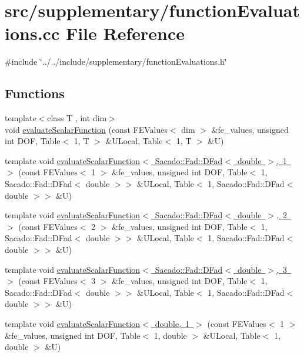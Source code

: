 \section{src/supplementary/function\+Evaluations.cc File Reference}
\label{function_evaluations_8cc}
{\ttfamily \#include \char`\"{}../../include/supplementary/function\+Evaluations.\+h\char`\"{}}\newline
\subsection*{Functions}
\begin{DoxyCompactItemize}
\item 
{\footnotesize template$<$class T , int dim$>$ }\\void \mbox{\hyperlink{group___evaluation_functions_ga399ae2353249293211c021848a64175c}{evaluate\+Scalar\+Function}} (const F\+E\+Values$<$ dim $>$ \&fe\+\_\+values, unsigned int D\+OF, Table$<$ 1, T $>$ \&U\+Local, Table$<$ 1, T $>$ \&U)
\item 
template void \mbox{\hyperlink{function_evaluations_8cc_a6856c1b1b83231bc778cecda3950533d}{evaluate\+Scalar\+Function$<$ Sacado\+::\+Fad\+::\+D\+Fad$<$ double $>$, 1 $>$}} (const F\+E\+Values$<$ 1 $>$ \&fe\+\_\+values, unsigned int D\+OF, Table$<$ 1, Sacado\+::\+Fad\+::\+D\+Fad$<$ double $>$$>$ \&U\+Local, Table$<$ 1, Sacado\+::\+Fad\+::\+D\+Fad$<$ double $>$$>$ \&U)
\item 
template void \mbox{\hyperlink{function_evaluations_8cc_af8ed01aa7f3c36625c149e3600d96714}{evaluate\+Scalar\+Function$<$ Sacado\+::\+Fad\+::\+D\+Fad$<$ double $>$, 2 $>$}} (const F\+E\+Values$<$ 2 $>$ \&fe\+\_\+values, unsigned int D\+OF, Table$<$ 1, Sacado\+::\+Fad\+::\+D\+Fad$<$ double $>$$>$ \&U\+Local, Table$<$ 1, Sacado\+::\+Fad\+::\+D\+Fad$<$ double $>$$>$ \&U)
\item 
template void \mbox{\hyperlink{function_evaluations_8cc_a57853d187be6c5f0a186e6ba62f141d6}{evaluate\+Scalar\+Function$<$ Sacado\+::\+Fad\+::\+D\+Fad$<$ double $>$, 3 $>$}} (const F\+E\+Values$<$ 3 $>$ \&fe\+\_\+values, unsigned int D\+OF, Table$<$ 1, Sacado\+::\+Fad\+::\+D\+Fad$<$ double $>$$>$ \&U\+Local, Table$<$ 1, Sacado\+::\+Fad\+::\+D\+Fad$<$ double $>$$>$ \&U)
\item 
template void \mbox{\hyperlink{function_evaluations_8cc_a436a979f117d9baba72821197a739e19}{evaluate\+Scalar\+Function$<$ double, 1 $>$}} (const F\+E\+Values$<$ 1 $>$ \&fe\+\_\+values, unsigned int D\+OF, Table$<$ 1, double $>$ \&U\+Local, Table$<$ 1, double $>$ \&U)

\end{DoxyCompactItemize}
